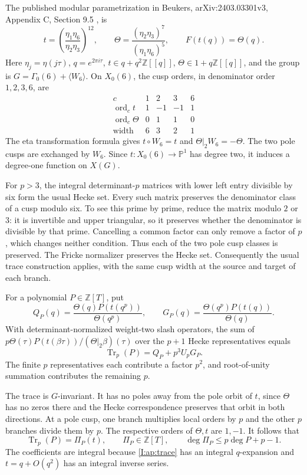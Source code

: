 \documentclass[11pt,letterpaper]{article}
\theoremstyle{definition}
\theoremstyle{remark}
\begin{document}
The published modular parametrization in Beukers, arXiv:2403.03301v3,
Appendix C, Section 9.5 \cite{III:Beukers2026}, is
\[
 t=\left(\frac{\eta_1\eta_6}{\eta_2\eta_3}\right)^{12},\qquad
 \Theta=\frac{(\eta_2\eta_3)^7}{(\eta_1\eta_6)^5},\qquad F(t(q))=\Theta(q).
\]
Here $\eta_j=\eta(j\tau)$, $q=e^{2\pi i\tau}$, $t\in q+q^2\mathbb Z[[q]]$, $\Theta\in1+q\mathbb Z[[q]]$,
and the group is $G=\Gamma_0(6)+\langle W_6\rangle$. On $X_0(6)$,
the cusp orders, in denominator order $1,2,3,6$, are
\[
\begin{array}{c|rrrr}
c&1&2&3&6\\\hline
\operatorname{ord}_c t&1&-1&-1&1\\
\operatorname{ord}_c\Theta&0&1&1&0\\
\text{width}&6&3&2&1
\end{array}
\]
The eta transformation formula gives $t\circ W_6=t$ and
$\Theta|_2 W_6=-\Theta$. The two pole cusps are exchanged by $W_6$.
Since $t:X_0(6)\to\mathbb P^1$ has degree two, it induces a degree-one
function on $X(G)$.

For $p>3$, the integral determinant-$p$ matrices with lower left entry
divisible by six form the usual Hecke set. Every such matrix preserves
the denominator class of a cusp modulo six. To see this prime by prime,
reduce the matrix modulo $2$ or $3$: it is invertible and upper triangular,
so it preserves whether the denominator is divisible by that prime.
Cancelling a common factor can only remove a factor of $p$, which changes
neither condition. Thus each of the two pole cusp classes is preserved.
The Fricke normalizer preserves the Hecke set. Consequently the usual
trace construction applies, with the same cusp width at the source and
target of each branch.

For a polynomial $P\in\mathbb Z[T]$, put
\[
 Q_P(q)=\frac{\Theta(q)P(t(q^p))}{\Theta(q^p)},\qquad
 G_P(q)=\frac{\Theta(q^p)P(t(q))}{\Theta(q)}.
\]
With determinant-normalized weight-two slash operators, the sum of
$p\Theta(\tau)P(t(\beta\tau))/(\Theta|_2\beta)(\tau)$ over the
$p+1$ Hecke representatives equals
\begin{equation}\label{I:ap:trace}
 \operatorname{Tr}_p(P)=Q_P+p^3 U_pG_P.
\end{equation}
The finite $p$ representatives each contribute a factor $p^2$, and
root-of-unity summation contributes the remaining $p$.

The trace is $G$-invariant. It has no poles away from the pole orbit of
$t$, since $\Theta$ has no zeros there and the Hecke correspondence
preserves that orbit in both directions. At a pole cusp, one branch
multiplies local orders by $p$ and the other $p$ branches divide them by
$p$. The respective orders of $\Theta,t$ are $1,-1$. It follows that
\begin{equation}\label{I:ap:tracepoly}
 \operatorname{Tr}_p(P)=\Pi_P(t),\qquad
 \Pi_P\in\mathbb Z[T],\qquad \deg\Pi_P\leq p\deg P+p-1.
\end{equation}
The coefficients are integral because \eqref{I:ap:trace} has an integral
$q$-expansion and $t=q+O(q^2)$ has an integral inverse series.
\end{document}

